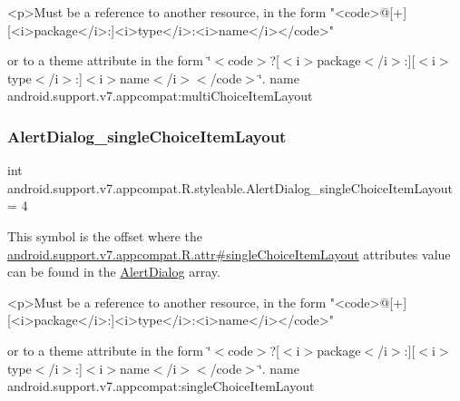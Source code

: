 \begin{DoxyVerb}      <p>Must be a reference to another resource, in the form "<code>@[+][<i>package</i>:]<i>type</i>:<i>name</i></code>"
\end{DoxyVerb}
 or to a theme attribute in the form \char`\"{}$<$code$>$?\mbox{[}$<$i$>$package$<$/i$>$\+:\mbox{]}\mbox{[}$<$i$>$type$<$/i$>$\+:\mbox{]}$<$i$>$name$<$/i$>$$<$/code$>$\char`\"{}.  name android.\+support.\+v7.\+appcompat\+:multi\+Choice\+Item\+Layout \mbox{\label{classandroid_1_1support_1_1v7_1_1appcompat_1_1R_1_1styleable_a00877e79ce4b825ec73c301c09717556}} 
\subsubsection{\texorpdfstring{Alert\+Dialog\+\_\+single\+Choice\+Item\+Layout}{AlertDialog\_singleChoiceItemLayout}}
{\footnotesize\ttfamily int android.\+support.\+v7.\+appcompat.\+R.\+styleable.\+Alert\+Dialog\+\_\+single\+Choice\+Item\+Layout = 4\hspace{0.3cm}{\ttfamily [static]}}

This symbol is the offset where the \hyperlink{classandroid_1_1support_1_1v7_1_1appcompat_1_1R_1_1attr_abbdfaca6ed87df489ea318ca3fbebc86}{android.\+support.\+v7.\+appcompat.\+R.\+attr\#single\+Choice\+Item\+Layout} attribute\textquotesingle{}s value can be found in the \hyperlink{classandroid_1_1support_1_1v7_1_1appcompat_1_1R_1_1styleable_a52dcd4f818920ef336f5b8033a2b34c1}{Alert\+Dialog} array.

\begin{DoxyVerb}      <p>Must be a reference to another resource, in the form "<code>@[+][<i>package</i>:]<i>type</i>:<i>name</i></code>"
\end{DoxyVerb}
 or to a theme attribute in the form \char`\"{}$<$code$>$?\mbox{[}$<$i$>$package$<$/i$>$\+:\mbox{]}\mbox{[}$<$i$>$type$<$/i$>$\+:\mbox{]}$<$i$>$name$<$/i$>$$<$/code$>$\char`\"{}.  name android.\+support.\+v7.\+appcompat\+:single\+Choice\+Item\+Layout \mbox{\label{classandroid_1_1support_1_1v7_1_1appcompat_1_1R_1_1styleable_a4a6b654a45dba60e2dbee9ce169563e2}} 
